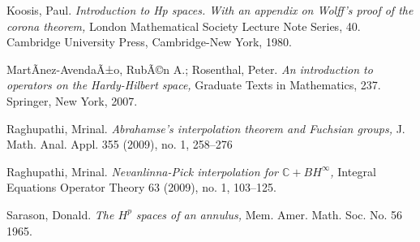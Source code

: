 \documentclass[12pt]{amsart}
\theoremstyle{definition}
\theoremstyle{remark}
\numberwithin{equation}{section}
\begin{document}
\begin{thebibliography}{99}
 Koosis, Paul. {\it  Introduction to Hp spaces. With an appendix on Wolff's proof of the corona theorem,} London Mathematical Society Lecture Note Series, 40. Cambridge University Press, Cambridge-New York, 1980.

 MartÃ­nez-AvendaÃ±o, RubÃ©n A.; Rosenthal, Peter. 
{\it An introduction to operators on the Hardy-Hilbert space,}
Graduate Texts in Mathematics, 237. Springer, New York, 2007.

  Raghupathi, Mrinal. {\it Abrahamse's interpolation theorem and Fuchsian groups,} J. Math. Anal. Appl. 355 (2009), no. 1, 258--276

  Raghupathi, Mrinal. {\it Nevanlinna-Pick interpolation for ${\mathbb C}+BH^\infty$,} Integral Equations Operator Theory 63 (2009), no. 1, 103--125.

  Sarason, Donald. {\it  The $H^p$ spaces of an annulus,} Mem. Amer. Math. Soc. No. 56 1965.

\end{thebibliography}

\printindex
\end{document}
